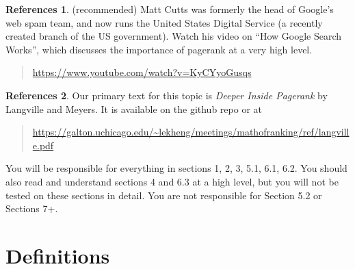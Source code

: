 \documentclass[10pt]{article}
\theoremstyle{definition}
\newtheorem{problem}{Problem}
\newtheorem{refr}{References}
\begin{document}
\begin{refr}
    (recommended)
    Matt Cutts was formerly the head of Google's web spam team,
    and now runs the United States Digital Service (a recently created branch of the US government).
    Watch his video on ``How Google Search Works'', which discusses the importance of pagerank at a very high level.
    \begin{quote}
    \url{https://www.youtube.com/watch?v=KyCYyoGusqs}
    \end{quote}
\end{refr}

\begin{refr}
    Our primary text for this topic is \emph{Deeper Inside Pagerank} by Langville and Meyers.
    It is available on the github repo or at
    \begin{quote}
    \url{https://galton.uchicago.edu/~lekheng/meetings/mathofranking/ref/langville.pdf}
    \end{quote}
    You will be responsible for everything in sections 1, 2, 3, 5.1, 6.1, 6.2.
    You should also read and understand sections 4 and 6.3 at a high level,
    but you will not be tested on these sections in detail.
    You are not responsible for Section 5.2 or Sections 7+.
\end{refr}

%

\newpage
\section{Definitions}
\end{document}
